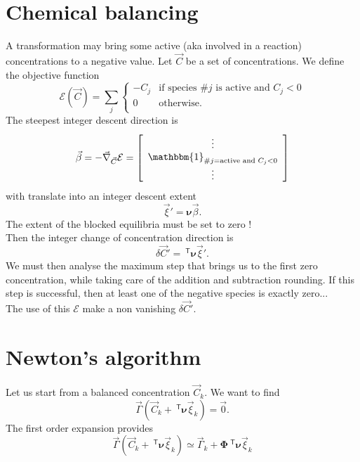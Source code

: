 \documentclass[aps]{revtex4}
\newcommand{\mymat}[1]{\bm{#1}}
\newcommand{\mytrn}[1]{~^{\mathsf{T}}{#1}}
\begin{document}
\section{Chemical balancing}
A transformation may bring some active (aka involved in a reaction) concentrations to a negative value.
Let $\vec{C}$ be a set of concentrations. We define the objective function
$$
	\mathcal{E}(\vec{C}) = \sum_j 
	\left
	\lbrace
		\begin{array}{rl}
		-C_j & \text{if species \#}j\text{ is active and } C_j<0\\
		0    & \text{otherwise.}\\
		\end{array} 
	\right.
$$
The steepest integer descent direction is
$$
	\vec{\beta} = -\vec{\nabla}_{\vec{C}} \mathcal{E} = 
	\left\lbrack
		\begin{array}{c}
		\vdots\\
		\mathbbm{1}_{\text{\#}j=\text{active and } C_j<0}\\
		\vdots
		\end{array}
	\right\rbrack
$$
with translate into an integer descent extent
$$
	\vec{\xi}' = \mymat{\nu} \vec{\beta}.
$$
The extent of the blocked equilibria must be set to zero !\\
Then the integer change of concentration direction is
$$
	\delta\vec{C}' = \mytrn{\mymat{\nu}}\vec{\xi}'.
$$
We must then analyse the maximum step that brings us to the
first zero concentration, while taking care of the addition and subtraction rounding.
If this step is successful, then at least one of the negative species is exactly zero...\\

The use of this $\mathcal{E}$ make a non vanishing $\delta\vec{C}'$.

\section{Newton's algorithm}
Let us start from a balanced concentration $\vec{C}_k$.
We want to find
$$
	\vec{\Gamma}(\vec{C}_k + \mytrn{\mymat{\nu}}\vec{\xi}_k) = \vec{0}.
$$
The first order expansion provides
$$
	\vec{\Gamma}(\vec{C}_k + \mytrn{\mymat{\nu}}\vec{\xi}_k) \simeq 
	\vec{\Gamma}_k + \mymat{\Phi}\mytrn{\mymat{\nu}} \vec{\xi}_k
$$
\end{document}
